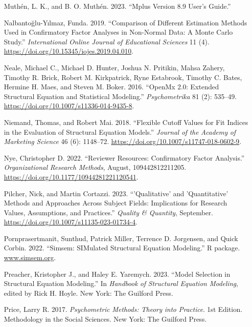 \documentclass[
  a4paper,
]{article}
\newlength{\cslhangindent}
\newenvironment{CSLReferences}[2] %
 {\begin{list}{}{%
  \setlength{\itemindent}{0pt}
  \setlength{\leftmargin}{0pt}
  \setlength{\parsep}{0pt}
  \ifodd #1
   \setlength{\leftmargin}{\cslhangindent}
   \setlength{\itemindent}{-1\cslhangindent}
  \fi
  \setlength{\itemsep}{#2\baselineskip}}}
 {\end{list}}
\begin{document}
\begin{CSLReferences}{1}{0}
Muthén, L. K., and B. O. Muthén. 2023. {``Mplus Version 8.9 User's
Guide.''}

Nalbantoğlu-Yılmaz, Funda. 2019. {``Comparison of {Different Estimation
Methods Used} in {Confirmatory Factor Analyses} in {Non-Normal Data}: {A
Monte Carlo Study}.''} \emph{International Online Journal of Educational
Sciences} 11 (4). \url{https://doi.org/10.15345/iojes.2019.04.010}.

Neale, Michael C., Michael D. Hunter, Joshua N. Pritikin, Mahsa Zahery,
Timothy R. Brick, Robert M. Kirkpatrick, Ryne Estabrook, Timothy C.
Bates, Hermine H. Maes, and Steven M. Boker. 2016. {``{OpenMx} 2.0:
{Extended Structural Equation} and {Statistical Modeling}.''}
\emph{Psychometrika} 81 (2): 535--49.
\url{https://doi.org/10.1007/s11336-014-9435-8}.

Niemand, Thomas, and Robert Mai. 2018. {``Flexible Cutoff Values for Fit
Indices in the Evaluation of Structural Equation Models.''}
\emph{Journal of the Academy of Marketing Science} 46 (6): 1148--72.
\url{https://doi.org/10.1007/s11747-018-0602-9}.

Nye, Christopher D. 2022. {``Reviewer {Resources}: {Confirmatory Factor
Analysis}.''} \emph{Organizational Research Methods}, August,
109442812211205. \url{https://doi.org/10.1177/10944281221120541}.

Pilcher, Nick, and Martin Cortazzi. 2023. {``'{Qualitative}' and
'Quantitative' Methods and Approaches Across Subject Fields:
Implications for Research Values, Assumptions, and Practices.''}
\emph{Quality \& Quantity}, September.
\url{https://doi.org/10.1007/s11135-023-01734-4}.

Pornprasertmanit, Sunthud, Patrick Miller, Terrence D. Jorgensen, and
Quick Corbin. 2022. {``Simsem: {SIMulated Structural Equation
Modeling}.''} R package. \href{https://www.simsem.org}{www.simsem.org}.

Preacher, Kristopher J., and Haley E. Yaremych. 2023. {``Model
{Selection} in {Structural Equation Modeling}.''} In \emph{Handbook of
{Structural Equation Modeling}}, edited by Rick H. Hoyle. New York: The
Guilford Press.

Price, Larry R. 2017. \emph{Psychometric {Methods}: {Theory} into
{Practice}}. 1st Edition. Methodology in the Social Sciences. New York:
The Guilford Press.


\end{CSLReferences}
\end{document}
